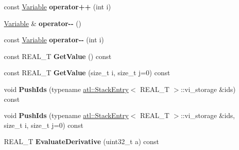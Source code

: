 \begin{DoxyCompactItemize}
\item 
\hypertarget{structatl_1_1_variable_aa48b49bfaa75a7eb17c26fe632c4bbbb}{const \hyperlink{structatl_1_1_variable}{Variable} {\bfseries operator++} (int i)}\label{structatl_1_1_variable_aa48b49bfaa75a7eb17c26fe632c4bbbb}

\item 
\hypertarget{structatl_1_1_variable_a9f5bfc096684109e36d3d397fad4b337}{\hyperlink{structatl_1_1_variable}{Variable} \& {\bfseries operator-\/-\/} ()}\label{structatl_1_1_variable_a9f5bfc096684109e36d3d397fad4b337}

\item 
\hypertarget{structatl_1_1_variable_ad54d90109a8d0242f291579581ed746b}{const \hyperlink{structatl_1_1_variable}{Variable} {\bfseries operator-\/-\/} (int i)}\label{structatl_1_1_variable_ad54d90109a8d0242f291579581ed746b}

\item 
\hypertarget{structatl_1_1_variable_a75e72fa736f11f18a328fd18172c6071}{const R\+E\+A\+L\+\_\+\+T {\bfseries Get\+Value} () const }\label{structatl_1_1_variable_a75e72fa736f11f18a328fd18172c6071}

\item 
\hypertarget{structatl_1_1_variable_a4e4c6c390e81522d7862fe5b9b803a1e}{const R\+E\+A\+L\+\_\+\+T {\bfseries Get\+Value} (size\+\_\+t i, size\+\_\+t j=0) const }\label{structatl_1_1_variable_a4e4c6c390e81522d7862fe5b9b803a1e}

\item 
\hypertarget{structatl_1_1_variable_a0060cd8c8081cb4e5c2a3a9967e10737}{void {\bfseries Push\+Ids} (typename \hyperlink{structatl_1_1_stack_entry}{atl\+::\+Stack\+Entry}$<$ R\+E\+A\+L\+\_\+\+T $>$\+::vi\+\_\+storage \&ids) const }\label{structatl_1_1_variable_a0060cd8c8081cb4e5c2a3a9967e10737}

\item 
\hypertarget{structatl_1_1_variable_aa2ab761e1449b8efcb3b86991a9dc764}{void {\bfseries Push\+Ids} (typename \hyperlink{structatl_1_1_stack_entry}{atl\+::\+Stack\+Entry}$<$ R\+E\+A\+L\+\_\+\+T $>$\+::vi\+\_\+storage \&ids, size\+\_\+t i, size\+\_\+t j=0) const }\label{structatl_1_1_variable_aa2ab761e1449b8efcb3b86991a9dc764}

\item 
\hypertarget{structatl_1_1_variable_a16eecc46193577d28dbe49b900f39701}{R\+E\+A\+L\+\_\+\+T {\bfseries Evaluate\+Derivative} (uint32\+\_\+t a) const }\label{structatl_1_1_variable_a16eecc46193577d28dbe49b900f39701}


\end{DoxyCompactItemize}
